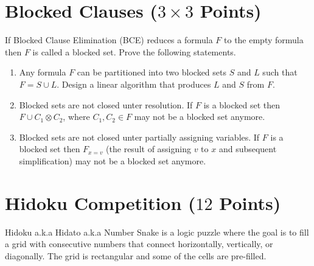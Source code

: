 \documentclass{article}
\begin{document}
\section{Blocked Clauses ($3\times 3$ Points)}
If Blocked Clause Elimination (BCE) reduces a formula $F$ to the empty formula then $F$ is called a blocked set.
Prove the following statements.
\vspace*{-1ex}
\begin{enumerate}\setlength{\itemsep}{0pt}
	\item Any formula $F$ can be partitioned into two blocked sets $S$ and $L$ such that $F = S\cup L$.
    Design a linear algorithm that produces $L$ and $S$ from $F$.
	\item Blocked sets are not closed unter resolution. 
    If $F$ is a blocked set then $F \cup C_1 \otimes C_2$, where $C_1,C_2 \in F$ may not be a blocked set anymore.
	\item Blocked sets are not closed unter partially assigning variables.
    If $F$ is a blocked set then $F_{x=v}$ (the result of assigning $v$ to $x$ and subsequent simplification) may not be a blocked set anymore.
\end{enumerate}

\section{Hidoku Competition ($12$ Points)}

\newcommand\setrow[4]{
  \setcounter{col}{1}
  \foreach \n in {#1, #2, #3, #4} {
    \edef\x{\value{col} - 0.5}
    \edef\y{4.5 - \value{row}}
    \node[anchor=center] at (\x, \y) {\n};
    \stepcounter{col}
  }
  \stepcounter{row}
}

Hidoku a.k.a Hidato a.k.a Number Snake is a logic puzzle where the goal is to fill a grid with consecutive numbers that connect horizontally, vertically, or diagonally. The grid is rectangular and some of the cells are pre-filled.\\[1ex]
\end{document}
